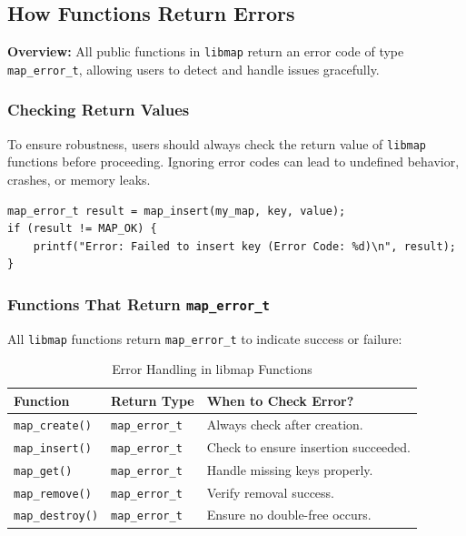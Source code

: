 \documentclass[titlepage]{article}
\begin{document}
\subsection{How Functions Return Errors}

\textbf{Overview:}
All public functions in \texttt{libmap} return an error code of type \texttt{map\_error\_t}, allowing users to detect and handle issues gracefully.

\subsubsection{Checking Return Values}

To ensure robustness, users should always check the return value of \texttt{libmap} functions before proceeding. Ignoring error codes can lead to undefined behavior, crashes, or memory leaks.

\begin{verbatim}
map_error_t result = map_insert(my_map, key, value);
if (result != MAP_OK) {
    printf("Error: Failed to insert key (Error Code: %d)\n", result);
}
\end{verbatim}

\subsubsection{Functions That Return \texttt{map\_error\_t}}

All \texttt{libmap} functions return \texttt{map\_error\_t} to indicate success or failure:

\begin{table}[h]
    \centering
    \renewcommand{\arraystretch}{1.3}
    \begin{tabular}{@{} l l p{6cm} @{}}
        \toprule
        \textbf{Function} & \textbf{Return Type} & \textbf{When to Check Error?} \\
        \midrule
        \texttt{map\_create()} & \texttt{map\_error\_t} & Always check after creation. \\
        \texttt{map\_insert()} & \texttt{map\_error\_t} & Check to ensure insertion succeeded. \\
        \texttt{map\_get()} & \texttt{map\_error\_t} & Handle missing keys properly. \\
        \texttt{map\_remove()} & \texttt{map\_error\_t} & Verify removal success. \\
        \texttt{map\_destroy()} & \texttt{map\_error\_t} & Ensure no double-free occurs. \\
        \bottomrule
    \end{tabular}
    \caption{Error Handling in libmap Functions}
\end{table}
\end{document}

